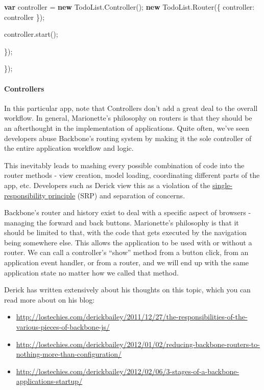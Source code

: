 \documentclass[9pt]{book}
\newenvironment{Shaded}{}{}
\newcommand{\KeywordTok}[1]{\textcolor[rgb]{0.00,0.44,0.13}{\textbf{{#1}}}}
\newcommand{\DataTypeTok}[1]{\textcolor[rgb]{0.56,0.13,0.00}{{#1}}}
\newcommand{\OtherTok}[1]{\textcolor[rgb]{0.00,0.44,0.13}{{#1}}}
\newcommand{\FunctionTok}[1]{\textcolor[rgb]{0.02,0.16,0.49}{{#1}}}
\newcommand{\NormalTok}[1]{{#1}}
\begin{document}
\begin{Shaded}
\begin{Highlighting}[]
    \KeywordTok{var} \NormalTok{controller = }\KeywordTok{new} \OtherTok{TodoList}\NormalTok{.}\FunctionTok{Controller}\NormalTok{();}
    \KeywordTok{new} \OtherTok{TodoList}\NormalTok{.}\FunctionTok{Router}\NormalTok{(\{}
      \DataTypeTok{controller}\NormalTok{: controller}
    \NormalTok{\});}

    \OtherTok{controller}\NormalTok{.}\FunctionTok{start}\NormalTok{();}

  \NormalTok{\});}

\NormalTok{\});}
\end{Highlighting}
\end{Shaded}

\paragraph{Controllers}\label{controllers-1}

In this particular app, note that Controllers don't add a great deal to
the overall workflow. In general, Marionette's philosophy on routers is
that they should be an afterthought in the implementation of
applications. Quite often, we've seen developers abuse Backbone's
routing system by making it the sole controller of the entire
application workflow and logic.

This inevitably leads to mashing every possible combination of code into
the router methods - view creation, model loading, coordinating
different parts of the app, etc. Developers such as Derick view this as
a violation of the
\href{http://en.wikipedia.org/wiki/Single_responsibility_principle}{single-responsibility
principle} (SRP) and separation of concerns.

Backbone's router and history exist to deal with a specific aspect of
browsers - managing the forward and back buttons. Marionette's
philosophy is that it should be limited to that, with the code that gets
executed by the navigation being somewhere else. This allows the
application to be used with or without a router. We can call a
controller's ``show'' method from a button click, from an application
event handler, or from a router, and we will end up with the same
application state no matter how we called that method.

Derick has written extensively about his thoughts on this topic, which
you can read more about on his blog:

\begin{itemize}
\itemsep1pt\parskip0pt
\item
  \url{http://lostechies.com/derickbailey/2011/12/27/the-responsibilities-of-the-various-pieces-of-backbone-js/}
\item
  \url{http://lostechies.com/derickbailey/2012/01/02/reducing-backbone-routers-to-nothing-more-than-configuration/}
\item
  \url{http://lostechies.com/derickbailey/2012/02/06/3-stages-of-a-backbone-applications-startup/}
\end{itemize}
\end{document}
